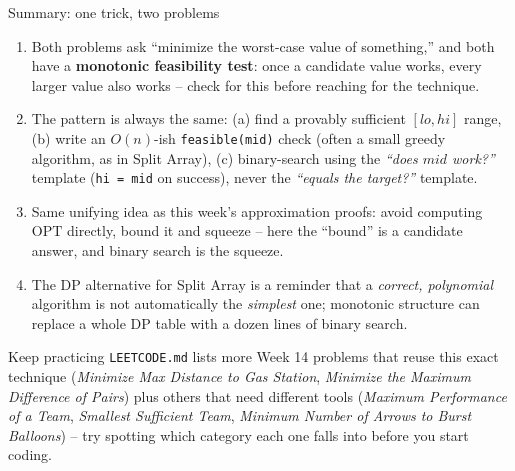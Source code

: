 \documentclass[11pt,aspectratio=169]{beamer}
\begin{document}
\begin{frame}{Summary: one trick, two problems}
  \footnotesize
  \begin{enumerate}
    \item Both problems ask ``minimize the worst-case value of something,'' and both have
    a \textbf{monotonic feasibility test}: once a candidate value works, every larger
    value also works -- check for this before reaching for the technique.
    \item The pattern is always the same: (a) find a provably sufficient $[lo, hi]$
    range, (b) write an $O(n)$-ish \texttt{feasible(mid)} check (often a small greedy
    algorithm, as in Split Array), (c) binary-search using the \emph{``does $mid$
    work?''} template (\texttt{hi = mid} on success), never the \emph{``equals the
    target?''} template.
    \item Same unifying idea as this week's approximation proofs: avoid computing
    $\mathrm{OPT}$ directly, bound it and squeeze -- here the ``bound'' is a candidate
    answer, and binary search is the squeeze.
    \item The DP alternative for Split Array is a reminder that a \emph{correct,
    polynomial} algorithm is not automatically the \emph{simplest} one; monotonic
    structure can replace a whole DP table with a dozen lines of binary search.
  \end{enumerate}
  \begin{alertblock}{Keep practicing}
    \texttt{LEETCODE.md} lists more Week 14 problems that reuse this exact technique
    (\emph{Minimize Max Distance to Gas Station}, \emph{Minimize the Maximum Difference of
    Pairs}) plus others that need different tools (\emph{Maximum Performance of a Team},
    \emph{Smallest Sufficient Team}, \emph{Minimum Number of Arrows to Burst Balloons}) --
    try spotting which category each one falls into before you start coding.
  \end{alertblock}
\end{frame}
\end{document}
